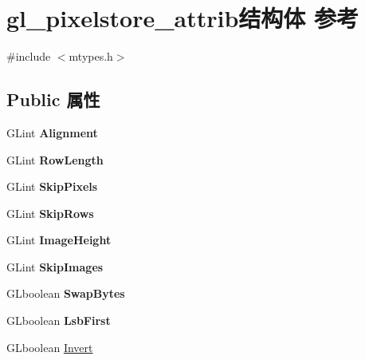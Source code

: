 \hypertarget{structgl__pixelstore__attrib}{}\section{gl\+\_\+pixelstore\+\_\+attrib结构体 参考}
\label{structgl__pixelstore__attrib}


{\ttfamily \#include $<$mtypes.\+h$>$}

\subsection*{Public 属性}
\begin{DoxyCompactItemize}
\item 
\mbox{\label{structgl__pixelstore__attrib_a495119c9d893a7c4df4c05ed26f6b10b}} 
G\+Lint {\bfseries Alignment}
\item 
\mbox{\label{structgl__pixelstore__attrib_ac90f8a9fac48549ad4099f65f06d68fd}} 
G\+Lint {\bfseries Row\+Length}
\item 
\mbox{\label{structgl__pixelstore__attrib_af3f288b5c37249a1cc360e7aaeedafb1}} 
G\+Lint {\bfseries Skip\+Pixels}
\item 
\mbox{\label{structgl__pixelstore__attrib_ac7039cc85f7e30b90bb5a339625b644a}} 
G\+Lint {\bfseries Skip\+Rows}
\item 
\mbox{\label{structgl__pixelstore__attrib_a28a3c042efdb2297a7083c359f9b0309}} 
G\+Lint {\bfseries Image\+Height}
\item 
\mbox{\label{structgl__pixelstore__attrib_a3ae50528ca67f0be042201d13f16583f}} 
G\+Lint {\bfseries Skip\+Images}
\item 
\mbox{\label{structgl__pixelstore__attrib_a43f6be12d2d56c99f98c96351f2a6685}} 
G\+Lboolean {\bfseries Swap\+Bytes}
\item 
\mbox{\label{structgl__pixelstore__attrib_a5a954c351a55181850b67521312ec6b5}} 
G\+Lboolean {\bfseries Lsb\+First}
\item 
G\+Lboolean \hyperlink{structgl__pixelstore__attrib_a6cc73c3174e226d479aaa02c362686fa}{Invert}
\end{DoxyCompactItemize}


